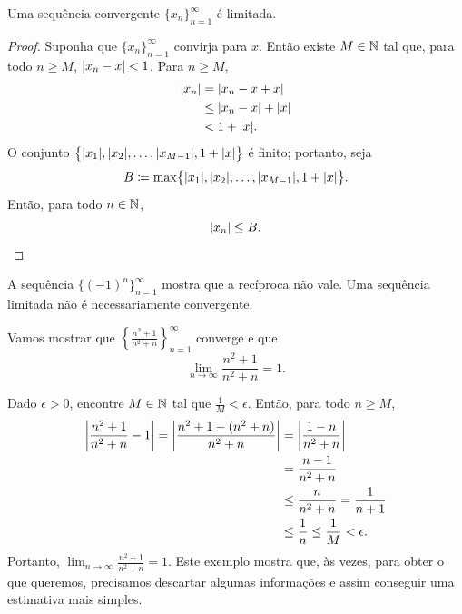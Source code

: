 \begin{prop}
Uma sequência convergente $\{ x_n \}_{n=1}^\infty$ é limitada.
\end{prop}

\begin{proof}
Suponha que $\{ x_n \}_{n=1}^\infty$ convirja para $x$. Então existe
$M \in {\mathbb{N}}$ tal que, para todo $n \geq M$,
$\lvert {x_n - x} \rvert < 1$. Para $n \geq M$,
\begin{equation*}
\begin{split}
\lvert {x_n} \rvert & = \lvert {x_n - x + x} \rvert
\\
& \leq \lvert {x_n - x} \rvert + \lvert {x} \rvert
\\
& < 1 + \lvert {x} \rvert .
\end{split}
\end{equation*}
O conjunto $\bigl\{ \lvert {x_1} \rvert, \lvert {x_2} \rvert, \ldots, \lvert {x_{M-1}} \rvert , 1+\lvert {x} \rvert \bigr\}$
é finito; portanto, seja
\begin{equation*}
B \coloneqq \max \bigl\{ \lvert {x_1} \rvert, \lvert {x_2} \rvert, \ldots, \lvert {x_{M-1}} \rvert, 1+\lvert {x} \rvert \bigr\} .
\end{equation*}
Então, para todo $n \in {\mathbb{N}}$,
\begin{equation*}
\lvert {x_n} \rvert \leq B. \qedhere
\end{equation*}
\end{proof}

A sequência $\bigl\{ {(-1)}^n \bigr\}_{n=1}^\infty$ mostra que a recíproca
não vale. Uma sequência limitada não é necessariamente convergente.

\begin{example}
Vamos mostrar que $\left\{ \frac{n^2+1}{n^2+n} \right\}_{n=1}^\infty$
converge e que
\begin{equation*}
\lim_{n\to\infty} \frac{n^2+1}{n^2+n} = 1 .
\end{equation*}

Dado $\epsilon > 0$, encontre $M \in {\mathbb{N}}$ tal que $\frac{1}{M} < \epsilon$.
Então, para todo $n \geq M$,
\begin{equation*}
\begin{split}
\left\lvert {\frac{n^2+1}{n^2+n} - 1} \right\rvert  =
\left\lvert {\frac{n^2+1 - (n^2+n)}{n^2+n}} \right\rvert
& =
\left\lvert {\frac{1 - n}{n^2+n}} \right\rvert \\
& =
\frac{n-1}{n^2+n} \\
& \leq 
\frac{n}{n^2+n} 
 =
\frac{1}{n+1}  \\
& \leq \frac{1}{n}
\leq \frac{1}{M} < \epsilon .
\end{split}
\end{equation*}
Portanto,
$\lim_{n\to\infty} \frac{n^2+1}{n^2+n} = 1$.
Este exemplo mostra que, às vezes, para obter o que queremos, precisamos
descartar algumas informações e assim conseguir uma estimativa mais simples.
\end{example}

